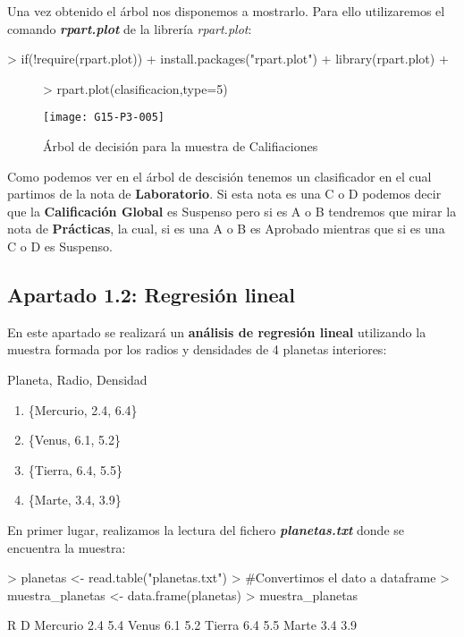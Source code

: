 \documentclass [a4paper] {article}
\begin{document}
Una vez obtenido el árbol nos disponemos a mostrarlo. Para ello utilizaremos el comando \textbf{\textit{rpart.plot}} de la librería \textit{rpart.plot}:
\begin{Schunk}
\begin{Sinput}
> if(!require(rpart.plot)){
+ 	install.packages("rpart.plot")
+ 	library(rpart.plot)
+ }
\end{Sinput}
\end{Schunk}
\newpage
\begin{figure}[h!]
\centering
\begin{Schunk}
\begin{Sinput}
> rpart.plot(clasificacion,type=5)
\end{Sinput}
\end{Schunk}
\texttt{[image: G15-P3-005]}
\caption{Árbol de decisión para la muestra de Califiaciones}
\end{figure}

Como podemos ver en el árbol de descisión tenemos un clasificador en el cual partimos de la nota de \textbf{Laboratorio}.
Si esta nota es una C o D podemos decir que la \textbf{Calificación Global} es Suspenso pero si es A o B tendremos que mirar
la nota de \textbf{Prácticas}, la cual, si es una A o B es Aprobado mientras que si es una C o D es Suspenso.

\newpage

\subsection{Apartado 1.2: Regresión lineal}
En este apartado se realizará un \textbf{análisis de regresión lineal} utilizando la muestra formada por los radios y densidades
de 4 planetas interiores:
\begin{center}
  {Planeta, Radio, Densidad}
  \begin{enumerate}
    \centering
    \item \{Mercurio, 2.4, 6.4\}
    \item \{Venus, 6.1, 5.2\}
    \item \{Tierra, 6.4, 5.5\}
    \item \{Marte, 3.4, 3.9\}
  \end{enumerate}
  \end{center}

En primer lugar, realizamos la lectura del fichero \textbf{\textit{planetas.txt}} donde se encuentra la muestra:
\begin{Schunk}
\begin{Sinput}
> planetas <- read.table("planetas.txt")
> #Convertimos el dato a dataframe
> muestra_planetas <- data.frame(planetas)
> muestra_planetas
\end{Sinput}
\begin{Soutput}
           R   D
Mercurio 2.4 5.4
Venus    6.1 5.2
Tierra   6.4 5.5
Marte    3.4 3.9
\end{Soutput}
\end{Schunk}
\end{document}
